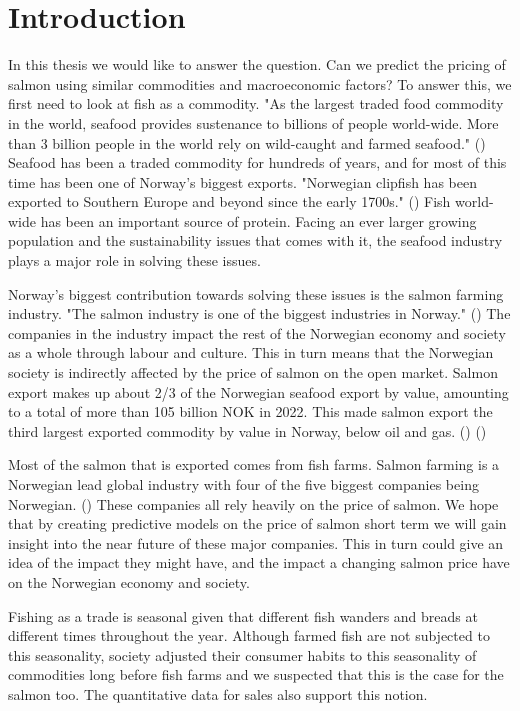 \section{Introduction}

In this thesis we would like to answer the question. 
Can we predict the pricing of salmon using similar commodities and macroeconomic factors? To answer this, we first need to look at fish as a commodity. "As the largest traded food commodity in the world, seafood provides sustenance to billions of people world-wide. More than 3 billion people in the world rely on wild-caught and farmed seafood." (\cite{wwf_2019}) Seafood has been a traded commodity for hundreds of years, and for most of this time has been one of Norway's biggest exports. "Norwegian clipfish has been exported to Southern Europe and beyond since the early 1700s." (\cite{seafood_from_norway_clipfish}) Fish world-wide has been an important source of protein. Facing an ever larger growing population and the sustainability issues that comes with it, the seafood industry plays a major role in solving these issues.

Norway's biggest contribution towards solving these issues is the salmon farming industry. "The salmon industry is one of the biggest industries in Norway." (\cite{Johansen_et_al_2019}) The companies in the industry impact the rest of the Norwegian economy and society as a whole through labour and culture. This in turn means that the Norwegian society is indirectly affected by the price of salmon on the open market. Salmon export makes up about 2/3 of the Norwegian seafood export by value, amounting to a total of more than 105 billion NOK in 2022. This made salmon export the third largest exported commodity by value in Norway, below oil and gas. (\cite{e24_gasprice_2023}) (\cite{seafood_nokkeltall})

Most of the salmon that is exported comes from fish farms. Salmon farming is a Norwegian lead global industry with four of the five biggest companies being Norwegian. (\cite{ilaks_2020}) These companies all rely heavily on the price of salmon. We hope that by creating predictive models on the price of salmon short term we will gain insight into the near future of these major companies. This in turn could give an idea of the impact they might have, and the impact a changing salmon price have on the Norwegian economy and society.

Fishing as a trade is seasonal given that different fish wanders and breads at different times throughout the year. Although farmed fish are not subjected to this seasonality, society adjusted their consumer habits to this seasonality of commodities long before fish farms and we suspected that this is the case for the salmon too. The quantitative data for sales also support this notion.

